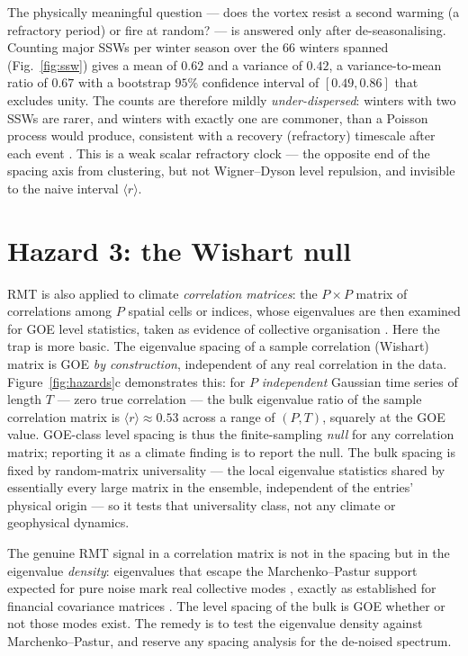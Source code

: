 \documentclass[11pt]{article}
\newcommand{\rr}{\langle r\rangle}
\begin{document}
The physically meaningful question --- does the vortex resist a second warming
(a refractory period) or fire at random? --- is answered only after
de-seasonalising. Counting major SSWs per winter season over the 66 winters
spanned (Fig.~\ref{fig:ssw}) gives a mean of $0.62$ and a variance of $0.42$, a
variance-to-mean ratio of $0.67$ with a bootstrap $95\%$ confidence interval of
$[0.49,0.86]$ that excludes unity. The counts are therefore mildly
\emph{under-dispersed}: winters with two SSWs are rarer, and winters with exactly
one are commoner, than a Poisson process would produce, consistent with a
recovery (refractory) timescale after each event \citep{ineson2024}. This is a
weak scalar refractory clock --- the opposite end of the spacing axis from
clustering, but not Wigner--Dyson level repulsion, and invisible to the naive
interval $\rr$.

\section{Hazard 3: the Wishart null}

RMT is also applied to climate \emph{correlation matrices}: the $P\times P$
matrix of correlations among $P$ spatial cells or indices, whose eigenvalues are
then examined for GOE level statistics, taken as evidence of collective
organisation \citep{santhanam2001}. Here the trap is more basic. The eigenvalue
spacing of a sample correlation (Wishart) matrix is GOE \emph{by construction},
independent of any real correlation in the data. Figure~\ref{fig:hazards}c
demonstrates this: for $P$ \emph{independent} Gaussian time series of length $T$
--- zero true correlation --- the bulk eigenvalue ratio of the sample correlation
matrix is $\rr\approx0.53$ across a range of $(P,T)$, squarely at the GOE value.
GOE-class level spacing is thus the finite-sampling \emph{null} for any
correlation matrix; reporting it as a climate finding is to report the null. The
bulk spacing is fixed by random-matrix universality --- the local eigenvalue
statistics shared by essentially every large matrix in the ensemble, independent
of the entries' physical origin --- so it tests that universality class, not any
climate or geophysical dynamics.

The genuine RMT signal in a correlation matrix is not in the spacing but in the
eigenvalue \emph{density}: eigenvalues that escape the Marchenko--Pastur support
expected for pure noise mark real collective modes \citep{marchenko1967}, exactly
as established for financial covariance matrices \citep{laloux1999,plerou2002}.
The level spacing of the bulk is GOE whether or not those modes exist. The remedy
is to test the eigenvalue density against Marchenko--Pastur, and reserve any
spacing analysis for the de-noised spectrum.
\end{document}
